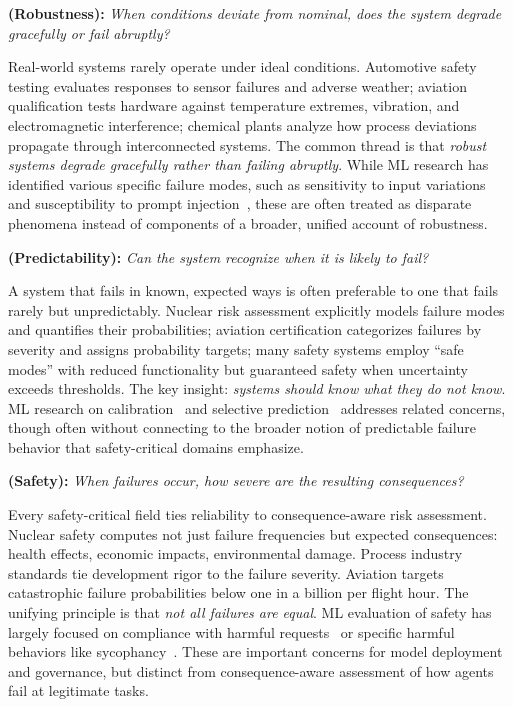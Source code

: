 \documentclass[11pt]{article}
\newcounter{dimension}
\begin{document}
\begin{dimensionbox}
\textbf{(Robustness):} \textit{When conditions deviate from nominal, does the system degrade gracefully or fail abruptly?}
\end{dimensionbox}
Real-world systems rarely operate under ideal conditions. Automotive safety testing evaluates responses to sensor failures and adverse weather; aviation qualification tests hardware against temperature extremes, vibration, and electromagnetic interference; chemical plants analyze how process deviations propagate through interconnected systems. The common thread is that \emph{robust systems degrade gracefully rather than failing abruptly}.
While ML research has identified various specific failure modes, such as sensitivity to input variations~\citep{wang2024rupbench, bogavelli2026enterprise} and susceptibility to prompt injection~\citep{nasr2025attacker}, these are often treated as disparate phenomena instead of components of a broader, unified account of robustness.

\begin{dimensionbox}
\textbf{(Predictability):} \textit{Can the system recognize when it is likely to fail?}
\end{dimensionbox}
A system that fails in known, expected ways is often preferable to one that fails rarely but unpredictably. Nuclear risk assessment explicitly models failure modes and quantifies their probabilities; aviation certification categorizes failures by severity and assigns probability targets; many safety systems employ ``safe modes'' with reduced functionality but guaranteed safety when uncertainty exceeds thresholds. The key insight: \emph{systems should know what they do not know}.
ML research on calibration~\citep{guo2017calibration, lin2022truthfulqa, li2023halueval} and selective prediction~\citep{el2010foundations, kalai2025hallucinate, artificialanalysis2025omniscience, rabanser2025does} addresses related concerns, though often without connecting to the broader notion of predictable failure behavior that safety-critical domains emphasize.

\begin{dimensionbox}
\textbf{(Safety):} \textit{When failures occur, how severe are the resulting consequences?}
\end{dimensionbox}
Every safety-critical field ties reliability to consequence-aware risk assessment. Nuclear safety computes not just failure frequencies but expected consequences: health effects, economic impacts, environmental damage. Process industry standards tie development rigor to the failure severity. Aviation targets catastrophic failure probabilities below one in a billion per flight hour. The unifying principle is that \emph{not all failures are equal}. ML evaluation of safety has largely focused on compliance with harmful requests~\citep{andriushchenko2025agentharm} or specific harmful behaviors like sycophancy~\citep{paech2025spiralbench}. These are important concerns for model deployment and governance, but distinct from consequence-aware assessment of how agents fail at legitimate tasks.
\end{document}
